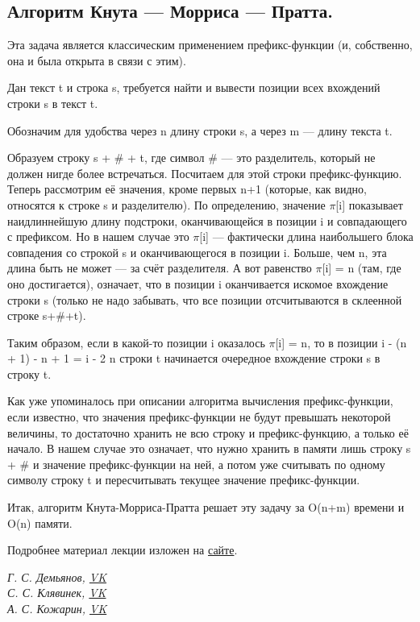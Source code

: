 \documentclass[a4paper,12pt]{article}
\theoremstyle{plain} %
\theoremstyle{definition} %
\theoremstyle{remark} %
\begin{document}
\subsection{Алгоритм Кнута — Морриса — Пратта.}
Эта задача является классическим применением префикс-функции (и, собственно, она и была открыта в связи с этим).

Дан текст t и строка s, требуется найти и вывести позиции всех вхождений строки s в текст t.

Обозначим для удобства через n длину строки s, а через m — длину текста t.

Образуем строку s + \# + t, где символ \# — это разделитель, который не должен нигде более встречаться. Посчитаем для этой строки префикс-функцию. Теперь рассмотрим её значения, кроме первых n+1 (которые, как видно, относятся к строке s и разделителю). По определению, значение $\pi$[i] показывает наидлиннейшую длину подстроки, оканчивающейся в позиции i и совпадающего с префиксом. Но в нашем случае это $\pi$[i] — фактически длина наибольшего блока совпадения со строкой s и оканчивающегося в позиции i. Больше, чем n, эта длина быть не может — за счёт разделителя. А вот равенство $\pi$[i] = n (там, где оно достигается), означает, что в позиции i оканчивается искомое вхождение строки s (только не надо забывать, что все позиции отсчитываются в склеенной строке s+\#+t).

Таким образом, если в какой-то позиции i оказалось $\pi$[i] = n, то в позиции i - (n + 1) - n + 1 = i - 2 n строки t начинается очередное вхождение строки s в строку t.

Как уже упоминалось при описании алгоритма вычисления префикс-функции, если известно, что значения префикс-функции не будут превышать некоторой величины, то достаточно хранить не всю строку и префикс-функцию, а только её начало. В нашем случае это означает, что нужно хранить в памяти лишь строку s + \# и значение префикс-функции на ней, а потом уже считывать по одному символу строку t и пересчитывать текущее значение префикс-функции.

Итак, алгоритм Кнута-Морриса-Пратта решает эту задачу за O(n+m) времени и O(n) памяти.

Подробнее материал лекции изложен на \href{http://e-maxx.ru/algo/prefix_function}{сайте}.




\begin{center}
	\vfill \emph{{\small Г. С. Демьянов, \href{https://vk.com/id37346992}{VK}\\
С. С. Клявинек, \href{https://vk.com/id85132547}{VK}\\
А. С. Кожарин, \href{https://vk.com/id92540660}{VK}
}}
\end{center}
\end{document}
